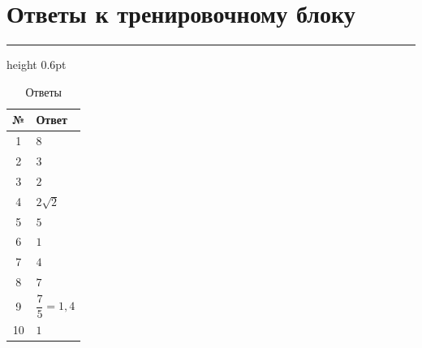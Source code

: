 \documentclass[a4paper,12pt]{article}
\newcommand{\sectionline}{
  \par
  \vspace{0.2em}
  {\color{accent}\hrule height 0.6pt}
  \vspace{0.8em}
}
\begin{document}

\clearpage

\section*{Ответы к тренировочному блоку}
\sectionline

\begin{table}[ht]
\centering
\caption{Ответы}

\begin{tabularx}{\linewidth}{@{}cX@{}}
\toprule
№ & Ответ \\
\midrule

1 & $8$ \\

2 & $3$ \\

3 & $2$ \\

4 & $2\sqrt2$ \\

5 & $5$ \\

6 & $1$ \\

7 & $4$ \\

8 & $7$ \\

9 & $\dfrac75=1{,}4$ \\

10 & $1$ \\

\bottomrule
\end{tabularx}

\end{table}
\end{document}
